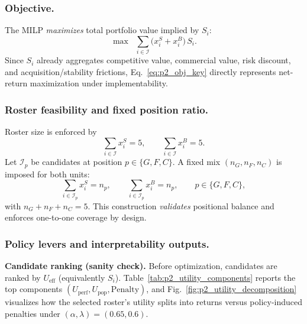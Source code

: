 \documentclass[12pt]{article}
\numberwithin{figure}{section}
\numberwithin{table}{section}
\begin{document}
	\subsubsection{Objective.}
	The MILP \emph{maximizes} total portfolio value implied by $S_i$:
	\begin{equation}\label{eq:p2_obj_key}
		\max \;\; \sum_{i\in\mathcal{I}} \big(x_i^{S}+x_i^{B}\big)\,S_i .
	\end{equation}
	Since $S_i$ already aggregates competitive value, commercial value, risk discount, and acquisition/stability frictions, Eq.~\eqref{eq:p2_obj_key} directly represents net-return maximization under implementability.
	
	\subsubsection{Roster feasibility and fixed position ratio.}
	Roster size is enforced by
	\[
	\sum_{i\in\mathcal{I}} x_i^{S}=5,\qquad \sum_{i\in\mathcal{I}} x_i^{B}=5.
	\]
	Let $\mathcal{I}_p$ be candidates at position $p\in\{G,F,C\}$. A fixed mix $(n_G,n_F,n_C)$ is imposed for both units:
	\begin{equation}\label{eq:p2_pos_ratio_key}
		\sum_{i\in\mathcal{I}_p} x_i^{S}=n_p,\qquad
		\sum_{i\in\mathcal{I}_p} x_i^{B}=n_p,\qquad
		p\in\{G,F,C\},
	\end{equation}
	with $n_G+n_F+n_C=5$. This construction \emph{validates} positional balance and enforces one-to-one coverage by design.
	
	\subsubsection{Policy levers and interpretability outputs.}
	

	\noindent \textbf{Candidate ranking (sanity check).}
	Before optimization, candidates are ranked by $U_{\mathrm{eff}}$ (equivalently $S_i$). Table~\ref{tab:p2_utility_components} reports the top components $(U_{\mathrm{perf}},U_{\mathrm{pop}},\text{Penalty})$, and Fig.~\ref{fig:p2_utility_decomposition} visualizes how the selected roster’s utility splits into returns versus policy-induced penalties under $(\alpha,\lambda)=(0.65,0.6)$.
	
\end{document}
